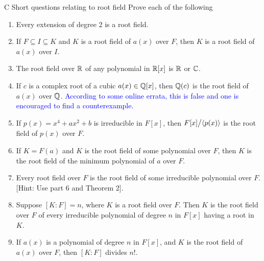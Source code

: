 \begin{exercise}{C Short questions relating to root field}
Prove each of the following
\begin{enumerate}
    \item Every extension of degree 2 is a root field.
    \item If $F\subseteq I\subseteq K$ and $K$ is a root field of $a(x)$ over $F$, then $K$ is a root field of $a(x)$ over $I$.
    \item The root field over $\mathbb{R}$ of any polynomial in $\mathbb{R}[x]$ is $\mathbb{R}$ or $\mathbb{C}$.
    \item If $c$ is a complex root of a cubic $a(x)\in\mathbb{Q}[x]$, then $\mathbb{Q}(c)$ is the root field of $a(x)$ over $\mathbb{Q}$. \textcolor{blue}{According to some online errata, this is false and one is encouraged to find a counterexample.}
    \item If $p(x)=x^4+ax^2+b$ is irreducible in $F[x]$, then ${\textstyle F[x]}\big/{\textstyle \langle p(x)\rangle}$ is the root field of $p(x)$ over $F$.
    \item If $K=F(a)$ and $K$ is the root field of some polynomial over $F$, then $K$ is the root field of the minimum polynomial of $a$ over $F$.
    \item Every root field over $F$ is the root field of some irreducible polynomial over $F$. [Hint: Use part 6 and Theorem 2].
    \item Suppose $[K:F]=n$, where $K$ is a root field over $F$. Then $K$ is the root field over $F$ of every irreducible polynomial of degree $n$ in $F[x]$ having a root in $K$. 
    \item If $a(x)$ is a polynomial of degree $n$ in $F[x]$, and $K$ is the root field of $a(x)$ over $F$, then $[K:F]$ divides $n!$.
\end{enumerate}
\end{exercise}
